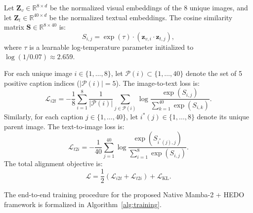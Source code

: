 \documentclass[conference]{IEEEtran}
\begin{document}
Let $\mathbf{Z}_v \in \mathbb{R}^{8 \times d}$ be the normalized visual embeddings of the 8 unique images, and let $\mathbf{Z}_t \in \mathbb{R}^{40 \times d}$ be the normalized textual embeddings. The cosine similarity matrix $\mathbf{S} \in \mathbb{R}^{8 \times 40}$ is:
\begin{equation}
\label{eq:similarity_matrix}
S_{i, j} = \exp(\tau) \cdot (\mathbf{z}_{v, i} \cdot \mathbf{z}_{t, j}),
\end{equation}
where $\tau$ is a learnable log-temperature parameter initialized to $\log(1/0.07) \approx 2.659$.

For each unique image $i \in \{1, \dots, 8\}$, let $\mathcal{P}(i) \subset \{1, \dots, 40\}$ denote the set of 5 positive caption indices ($|\mathcal{P}(i)| = 5$). The image-to-text loss is:
\begin{equation}
\label{eq:infonce_i2t}
\mathcal{L}_{i2t} = -\frac{1}{8} \sum_{i=1}^8 \frac{1}{|\mathcal{P}(i)|} \sum_{j \in \mathcal{P}(i)} \log \frac{\exp(S_{i, j})}{\sum_{k=1}^{40} \exp(S_{i, k})}.
\end{equation}
Similarly, for each caption $j \in \{1, \dots, 40\}$, let $i^*(j) \in \{1, \dots, 8\}$ denote its unique parent image. The text-to-image loss is:
\begin{equation}
\label{eq:infonce_t2i}
\mathcal{L}_{t2i} = -\frac{1}{40} \sum_{j=1}^{40} \log \frac{\exp(S_{i^*(j), j})}{\sum_{i=1}^{8} \exp(S_{i, j})}.
\end{equation}
The total alignment objective is:
\begin{equation}
\label{eq:total_loss}
\mathcal{L} = \frac{1}{2}\left( \mathcal{L}_{i2t} + \mathcal{L}_{t2i} \right) + \mathcal{L}_{\mathrm{KL}}.
\end{equation}

The end-to-end training procedure for the proposed Native Mamba-2 + HEDO framework is formalized in Algorithm~\ref{alg:training}.
\end{document}

